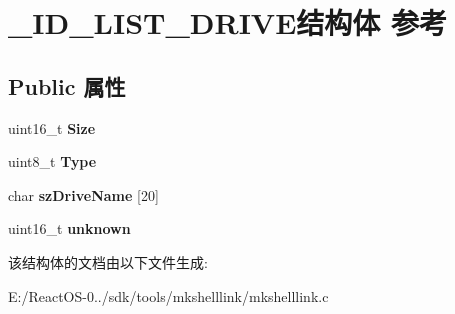 \hypertarget{struct___i_d___l_i_s_t___d_r_i_v_e}{}\section{\+\_\+\+I\+D\+\_\+\+L\+I\+S\+T\+\_\+\+D\+R\+I\+V\+E结构体 参考}
\label{struct___i_d___l_i_s_t___d_r_i_v_e}
\subsection*{Public 属性}
\begin{DoxyCompactItemize}
\item 
\mbox{\label{struct___i_d___l_i_s_t___d_r_i_v_e_a97b44832e827e70a62ea9ce87a53d2d7}} 
uint16\+\_\+t {\bfseries Size}
\item 
\mbox{\label{struct___i_d___l_i_s_t___d_r_i_v_e_ac27d9a980567607ddc02391b970d2f32}} 
uint8\+\_\+t {\bfseries Type}
\item 
\mbox{\label{struct___i_d___l_i_s_t___d_r_i_v_e_a7dc68806c432c2f43979359e65a5e669}} 
char {\bfseries sz\+Drive\+Name} \mbox{[}20\mbox{]}
\item 
\mbox{\label{struct___i_d___l_i_s_t___d_r_i_v_e_a568ed49f5d2871cbdec9a7818083d90e}} 
uint16\+\_\+t {\bfseries unknown}
\end{DoxyCompactItemize}


该结构体的文档由以下文件生成\+:\begin{DoxyCompactItemize}
\item 
E\+:/\+React\+O\+S-\/0../sdk/tools/mkshelllink/mkshelllink.\+c\end{DoxyCompactItemize}
